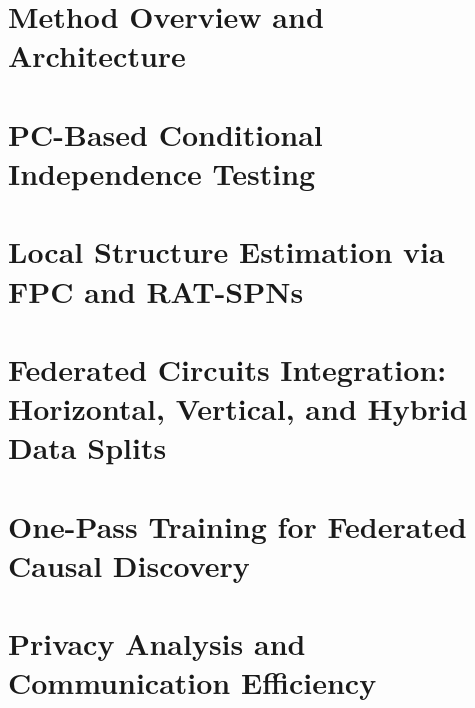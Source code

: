 \section{Method Overview and Architecture}


\section{PC-Based Conditional Independence Testing}\label{sec:federated-ci}


\section{Local Structure Estimation via FPC and RAT-SPNs}\label{sec:pc-architecture-method}


\section{Federated Circuits Integration: Horizontal, Vertical, and Hybrid Data Splits}\label{sec:pc-fl-duality}


\section{One-Pass Training for Federated Causal Discovery}


\section{Privacy Analysis and Communication Efficiency}\label{sec:privacy}
